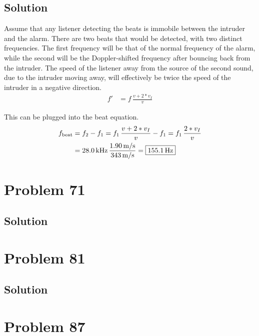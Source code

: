 \documentclass[12pt]{article}
\begin{document}
        \subsection{Solution}
            Assume that any listener detecting the beats is immobile between the intruder and the alarm.
            There are two beats that would be detected, with two distinct frequencies.
            The first frequency will be that of the normal frequency of the alarm, while the second will be the Doppler-shifted frequency after bouncing back from the intruder.
            The speed of the listener away from the source of the second sound, due to the intruder moving away, will effectively be twice the speed of the intruder in a negative direction.
            \begin{align}
                f'  &=  f\,\frac{v + 2 * v_I}{v}
            \end{align}

            This can be plugged into the beat equation.
            \begin{align}
                f_{\rm beat}    &=  f_2 - f_1
                    =   f_1\,\frac{v + 2 * v_I}{v} - f_1
                    =   f_1\,\frac{2 * v_I}{v}\\
                    &=  28.0\,\unit{\kilo\hertz}\,\frac{1.90\,\unit{\meter/\second}}{343\,\unit{\meter/\second}}
                    =   \boxed{155.1\,\unit{\hertz}}
            \end{align}

    \pagebreak
    \section{Problem 71}

        \subsection{Solution}

    \pagebreak
    \section{Problem 81}

        \subsection{Solution}

    \pagebreak
    \section{Problem 87}
\end{document}
